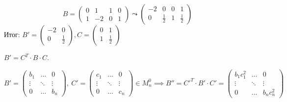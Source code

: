 \begin{example}
    \begin{equation*}
         B = \left(
            \begin{array}{cc|cc} 
                0 & 1 & 1 & 0 \\ 
                1 & -2 & 0 & 1
            \end{array} 
        \right) \leadsto
        \left(
            \begin{array}{cc|cc}
                -2 & 0 & 0 & 1 \\
                0 & \frac{1}{2} & 1 & \frac{1}{2}
            \end{array}
        \right)
    \end{equation*}
    Итог: $B' = \begin{pmatrix} -2 & 0 \\ 0 & \frac{1}{2} \end{pmatrix}, C = \begin{pmatrix} 0 & 1 \\ 1 & \frac{1}{2} \end{pmatrix}$

    $B' = C^{T} \cdot B \cdot C$.
\end{example}

\begin{comment}
    Базис $\E'$ в котором матрица билинейного отображения $\beta$ имеет диагональный вид, а также сам этот вид определены неоднозначно.
\end{comment}

\begin{example}
    \begin{equation*}
        B' = \begin{pmatrix}
            b_{1} & \dots & 0 \\
            \vdots & \ddots & \vdots \\
            0 & \dots & b_{n}
        \end{pmatrix}, \
        C' = \begin{pmatrix}
            c_{1} & \dots & 0 \\
            \vdots & \ddots & \vdots \\
            0 & \dots & c_{n}
        \end{pmatrix} \in M^{0}_{n} \implies
        B'' = C'^{T} \cdot B' \cdot C' =
        \begin{pmatrix}
            b_{1} c_{1}^{2} & \dots & 0 \\
            \vdots & \ddots & \vdots \\
            0 & \dots & b_{n} c_{n}^{2}
        \end{pmatrix}
    \end{equation*}
\end{example}
